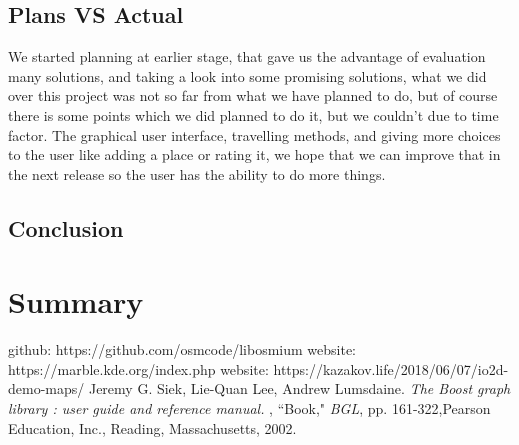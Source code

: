 \documentclass[a4paper, 12pt, english]{book}
\begin{document}
\section{Plans VS Actual}
We started planning at earlier stage, that gave us the advantage of evaluation many solutions, and taking a look into some promising solutions, what we did over this project was not so far from what we have planned to do, but of course there is some points which we did planned to do it, but we couldn't due to time factor.
The graphical user interface, travelling methods, and giving more choices to the user like adding a place or rating it, we hope that we can improve that in the next release so the user has the ability to do more things.

\section{Conclusion}




\chapter{Summary}



\begin{thebibliography}{12}
github: https://github.com/osmcode/libosmium
website: https://marble.kde.org/index.php
website: https://kazakov.life/2018/06/07/io2d-demo-maps/
Jeremy G. Siek,
Lie-Quan Lee, Andrew Lumsdaine.
\textit{The Boost graph library : user guide and reference manual.} , ``Book," \emph{BGL}, pp. 161-322,Pearson Education, Inc., Reading, Massachusetts, 2002.
\end{thebibliography}
\end{document}
